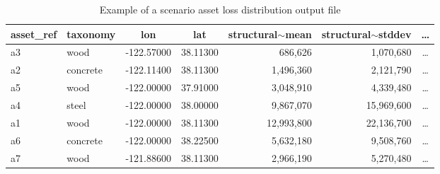 \begin{table}[htbp]
\centering
\begin{tabular}{llccrrc}
\hline
\rowcolor{lightgray}
\textbf{asset\_ref} & \textbf{taxonomy} & \textbf{lon} & \textbf{lat} & \textbf{structural$\sim$mean} & \textbf{structural$\sim$stddev} & \ldots \\ \hline
a3 & wood & -122.57000 & 38.11300 & 686,626 & 1,070,680 & \ldots \\
a2 & concrete & -122.11400 & 38.11300 & 1,496,360 & 2,121,790 & \ldots \\
a5 & wood & -122.00000 & 37.91000 & 3,048,910 & 4,339,480 & \ldots \\
a4 & steel & -122.00000 & 38.00000 & 9,867,070 & 15,969,600 & \ldots \\
a1 & wood & -122.00000 & 38.11300 & 12,993,800 & 22,136,700 & \ldots \\
a6 & concrete & -122.00000 & 38.22500 & 5,632,180 & 9,508,760 & \ldots \\
a7 & wood & -121.88600 & 38.11300 & 2,966,190 & 5,270,480 & \ldots \\
\hline
\end{tabular}
\caption{Example of a scenario asset loss distribution output file}
\label{output:scenario_loss_asset}
\end{table}

